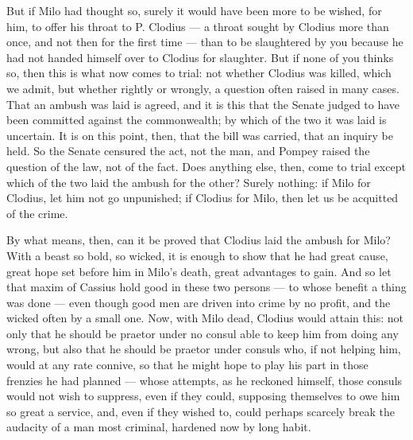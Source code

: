  But if Milo had thought so, surely it would have been more to be wished, for him, to offer his throat to P. Clodius --- a throat sought by Clodius more than once, and not then for the first time --- than to be slaughtered by you because he had not handed himself over to Clodius for slaughter. But if none of you thinks so, then this is what now comes to trial: not whether Clodius was killed, which we admit, but whether rightly or wrongly, a question often raised in many cases. That an ambush was laid is agreed, and it is this that the Senate judged to have been committed against the commonwealth; by which of the two it was laid is uncertain. It is on this point, then, that the bill was carried, that an inquiry be held. So the Senate censured the act, not the man, and Pompey raised the question of the law, not of the fact. Does anything else, then, come to trial except which of the two laid the ambush for the other? Surely nothing: if Milo for Clodius, let him not go unpunished; if Clodius for Milo, then let us be acquitted of the crime.

 By what means, then, can it be proved that Clodius laid the ambush for Milo? With a beast so bold, so wicked, it is enough to show that he had great cause, great hope set before him in Milo's death, great advantages to gain. And so let that maxim of Cassius hold good in these two persons --- to whose benefit a thing was done --- even though good men are driven into crime by no profit, and the wicked often by a small one. Now, with Milo dead, Clodius would attain this: not only that he should be praetor under no consul able to keep him from doing any wrong, but also that he should be praetor under consuls who, if not helping him, would at any rate connive, so that he might hope to play his part in those frenzies he had planned --- whose attempts, as he reckoned himself, those consuls would not wish to suppress, even if they could, supposing themselves to owe him so great a service, and, even if they wished to, could perhaps scarcely break the audacity of a man most criminal, hardened now by long habit.

